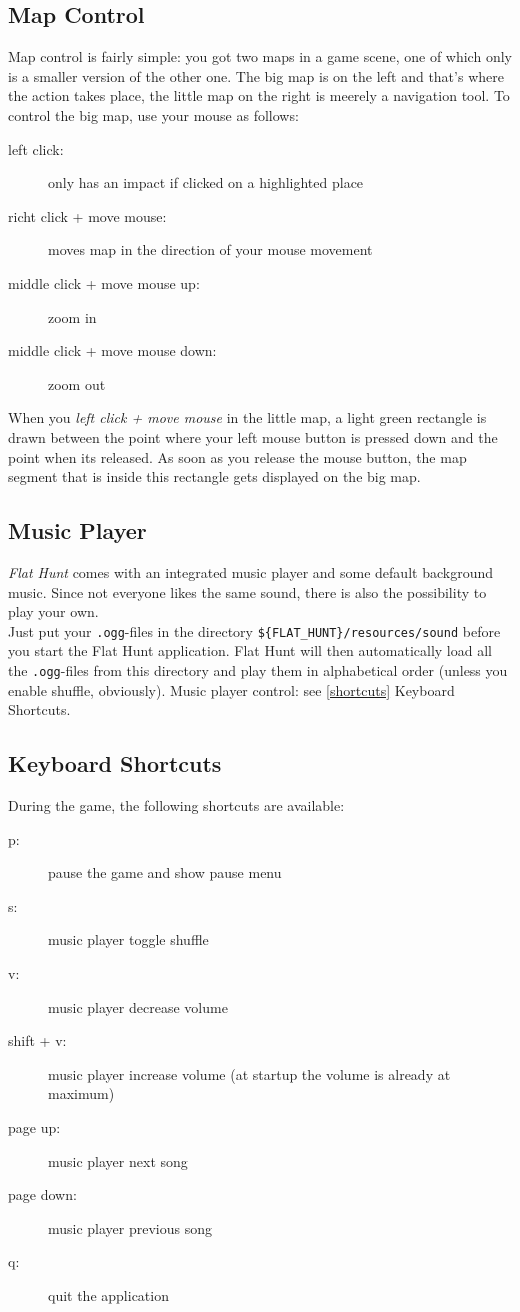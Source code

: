 \subsection{Map Control}
Map control is fairly simple: you got two maps in a game scene, one of which only is a smaller version of the other one. The big map is on the left and that's where the action takes place, the little map on the right is meerely a navigation tool. To control the big map, use your mouse as follows:

  \begin{description}
    \item[left click:] only has an impact if clicked on a highlighted place
    \item[richt click + move mouse:] moves map in the direction of your mouse movement
    \item[middle click + move mouse up:] zoom in
    \item[middle click + move mouse down:] zoom out
  \end{description}

  When you \emph{left click + move mouse} in the little map, a light green rectangle is drawn between the point where your left mouse button is pressed down and the point when its released. As soon as you release the mouse button, the map segment that is inside this rectangle gets displayed on the big map.
 
\subsection{Music Player}
\emph{Flat Hunt} comes with an integrated music player and some default background music. Since not everyone likes the same sound, there is also the possibility to play your own.\\ 
Just put your \texttt{.ogg}-files in the directory \texttt{\$\{FLAT\_HUNT\}/resources/sound} before you start the Flat Hunt application. Flat Hunt will then automatically load all the \texttt{.ogg}-files from this directory and play them in alphabetical order (unless you enable shuffle, obviously). Music player control: see \ref{shortcuts} Keyboard Shortcuts.

\subsection{\label{shortcuts}Keyboard Shortcuts}

During the game, the following shortcuts are available:

  \begin{description}
    \item[p:] pause the game and show pause menu
    \item[s:] music player toggle shuffle
    \item[v:] music player decrease volume
    \item[shift + v:] music player increase volume (at startup the volume is already at maximum)
    \item[page up:] music player next song
    \item[page down:] music player previous song
    \item[q:] quit the application
  \end{description}

